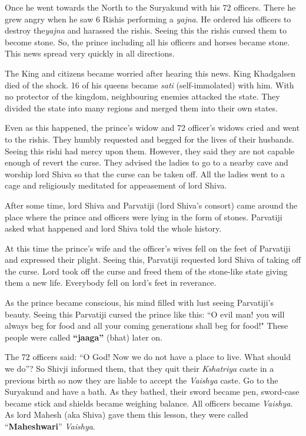 Once he went towards the North to the Suryakund with his 72 officers. There he
grew angry when he saw 6 Rishis performing a \textit{yajna}. He ordered his
officers to destroy the\textit{yajna} and harassed the rishis. Seeing this the
rishis cursed them to become stone. So, the prince including all his officers
and horses became stone. This news spread very quickly in all directions.

The King and citizens became worried after hearing this news. King Khadgalsen
died of the shock. 16 of his queens became \textit{sati} (self-immolated) with
him. With no protector of the kingdom, neighbouring enemies attacked the state.
They divided the state into many regions and merged them into their own states.

Even as this happened, the prince's widow and 72 officer's widows cried and
went to the rishis. They humbly requested and begged for the lives of their
husbands. Seeing this rishi had mercy upon them. However, they said they are
not capable enough of revert the curse. They advised the ladies to go to a
nearby cave and worship lord Shiva so that the curse can be taken off. All the
ladies went to a cage and religiously meditated for appeasement of lord Shiva.

After some time, lord Shiva and Parvatiji (lord Shiva's consort) came around
the place where the prince and officers were lying in the form of stones.
Parvatiji asked what happened and lord Shiva told the whole history.

At this time the prince's wife and the officer's wives fell on the feet of
Parvatiji and expressed their plight. Seeing this, Parvatiji requested lord
Shiva of taking off the curse. Lord took off the curse and freed them of the
stone-like state giving them a new life. Everybody fell on lord's feet in
reverance.

As the prince became conscious, his mind filled with lust seeing Parvatiji's
beauty. Seeing this Parvatiji cursed the prince like this: ``O evil man! you
will always beg for food and all your coming generations shall beg for food!"
These people were called \textbf{``jaaga''} (bhat) later on.

The 72 officers said: ``O God! Now we do not have a place to live. What should
we do''? So Shivji informed them, that they quit their \textit{Kshatriya} caste
in a previous birth so now they are liable to accept the \textit{Vaishya}
caste. Go to the Suryakund and have a bath. As they bathed, their sword became
pen, sword-case became stick and shields became weighing balance. All officers
became \textit{Vaishya}. As lord Mahesh (aka Shiva) gave them this lesson, they
were called ``\textbf{Maheshwari}'' \textit{Vaishya}.

